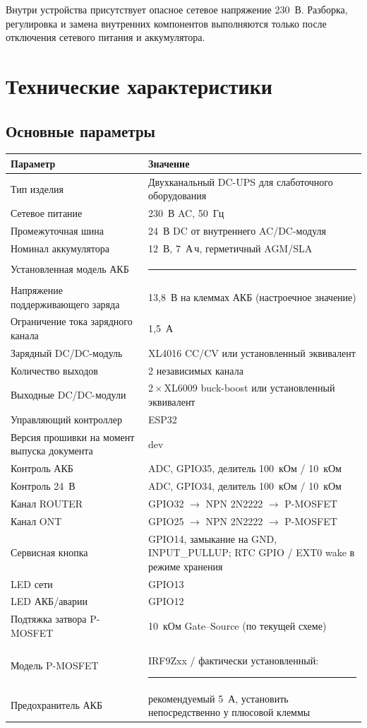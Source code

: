 \documentclass[11pt,a4paper]{article}
\newcommand{\fwversion}{dev}%
\begin{document}
\begin{tcolorbox}[colback=lightwarn,colframe=warn,title=Важно]
Внутри устройства присутствует опасное сетевое напряжение 230~В. Разборка, регулировка и замена внутренних компонентов выполняются только после отключения сетевого питания и аккумулятора.
\end{tcolorbox}

\section{Технические характеристики}

\subsection{Основные параметры}
\begin{longtable}{@{}p{70mm}p{80mm}@{}}
\toprule
\textbf{Параметр} & \textbf{Значение} \\
\midrule
\endhead
Тип изделия & Двухканальный DC-UPS для слаботочного оборудования \\
Сетевое питание & 230~В AC, 50~Гц \\
Промежуточная шина & 24~В DC от внутреннего AC/DC-модуля \\
Номинал аккумулятора & 12~В, 7~А\,ч, герметичный AGM/SLA \\
Установленная модель АКБ & \rule{60mm}{0.4pt} \\
Напряжение поддерживающего заряда & 13,8~В на клеммах АКБ (настроечное значение) \\
Ограничение тока зарядного канала & 1,5~А \\
Зарядный DC/DC-модуль & XL4016 CC/CV или установленный эквивалент \\
Количество выходов & 2 независимых канала \\
Выходные DC/DC-модули & 2\,$\times$\,XL6009 buck-boost или установленный эквивалент \\
Управляющий контроллер & ESP32 \\
Версия прошивки на момент выпуска документа & \fwversion \\
Контроль АКБ & ADC, GPIO35, делитель 100~кОм / 10~кОм \\
Контроль 24~В & ADC, GPIO34, делитель 100~кОм / 10~кОм \\
Канал ROUTER & GPIO32 $\rightarrow$ NPN 2N2222 $\rightarrow$ P-MOSFET \\
Канал ONT & GPIO25 $\rightarrow$ NPN 2N2222 $\rightarrow$ P-MOSFET \\
Сервисная кнопка & GPIO14, замыкание на GND, INPUT\_PULLUP; RTC GPIO / EXT0 wake в режиме хранения \\
LED сети & GPIO13 \\
LED АКБ/аварии & GPIO12 \\
Подтяжка затвора P-MOSFET & 10~кОм Gate--Source (по текущей схеме) \\
Модель P-MOSFET & IRF9Zxx / фактически установленный: \rule{35mm}{0.4pt} \\
Предохранитель АКБ & рекомендуемый 5~А, установить непосредственно у плюсовой клеммы \\
\bottomrule
\end{longtable}
\end{document}
